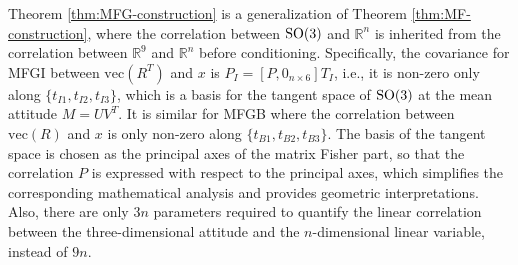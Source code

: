 Theorem \ref{thm:MFG-construction} is a generalization of Theorem \ref{thm:MF-construction}, where the correlation between $\mathrm{SO}(3)$ and $\mathbb{R}^n$ is inherited from the correlation between $\mathbb{R}^9$ and $\mathbb{R}^n$ before conditioning.
Specifically, the covariance for MFGI between $\mathrm{vec}(R^T)$ and $x$ is $P_I =[ P, 0_{n\times 6}]T_I$, i.e., it is non-zero only along $\{t_{I1}, t_{I2}, t_{I3}\}$, which is a basis for the tangent space of $\mathrm{SO}(3)$ at the mean attitude $M=UV^T$.
It is similar for MFGB where the correlation between $\mathrm{vec}(R)$ and $x$ is only non-zero along $\{t_{B1}, t_{B2}, t_{B3}\}$.
The basis of the tangent space is chosen as the principal axes of the matrix Fisher part, so that the correlation $P$ is expressed with respect to the principal axes, which simplifies the corresponding mathematical analysis and provides geometric interpretations.
Also, there are only $3n$ parameters required to quantify the linear correlation between the three-dimensional attitude and the $n$-dimensional linear variable, instead of $9n$.

